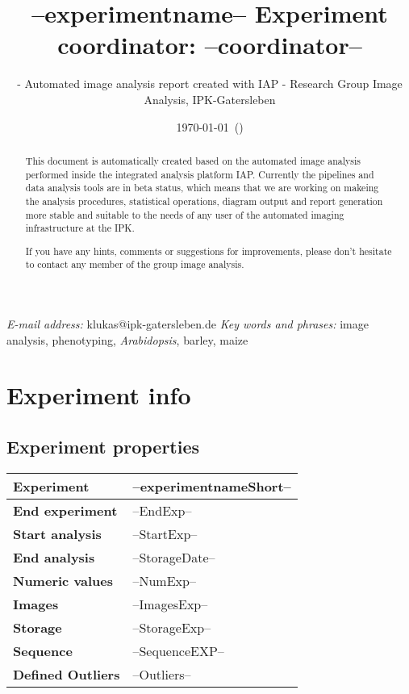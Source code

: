 % 





\title{--experimentname-- \tabularnewline \vspace{10 mm} \large{Experiment coordinator: --coordinator--}}

\author{- Automated image analysis report created with IAP - \tabularnewline Research Group Image Analysis, IPK-Gatersleben}

\date{\today ~(\currenttime )}

\maketitle
\thispagestyle{empty}  
\begin{abstract}
This document is automatically created based on the automated image analysis performed inside the integrated analysis platform IAP. Currently the pipelines and data analysis tools are in beta status, 
which means that we are working on makeing the analysis procedures, statistical operations, diagram output and report
generation more stable and suitable to the needs of any user of the automated imaging infrastructure at the IPK.

If you have any hints, comments or suggestions for improvements, please don't hesitate to contact any member of the group image analysis.
\end{abstract}
\vfill
\small{\textit{E-mail address:} klukas@ipk-gatersleben.de}
\newline 
\small{\textit{Key words and phrases:} image analysis, phenotyping, \textit{Arabidopsis}, barley, maize }
 
\addtocounter{page}{-1}
\clearpage
\tableofcontents

\clearpage
\pagestyle{headings}
\section{Experiment info} 
\subsection{Experiment properties}
\begin{center}
	\begin{tabular}{|p{3cm}|p{13cm}|}
	\hline
	{\textbf{Experiment}} & --experimentnameShort--\tabularnewline
	\hline
	\hline
	{\textbf{End experiment}} & --EndExp--\tabularnewline
	\hline
	{\textbf{Start analysis}} & --StartExp--\tabularnewline
	\hline
	{\textbf{End analysis}} & --StorageDate--\tabularnewline
	\hline
	{\textbf{Numeric values}} & --NumExp-- \tabularnewline
	\hline
	{\textbf{Images}} & --ImagesExp-- \tabularnewline
	\hline
	{\textbf{Storage}} & --StorageExp-- \tabularnewline
	\hline
	{\textbf{Sequence}} & --SequenceEXP-- \tabularnewline
	\hline
	{\textbf{Defined Outliers}} & --Outliers-- \tabularnewline
	\hline
	\hline 
	\end{tabular}
\end{center}

